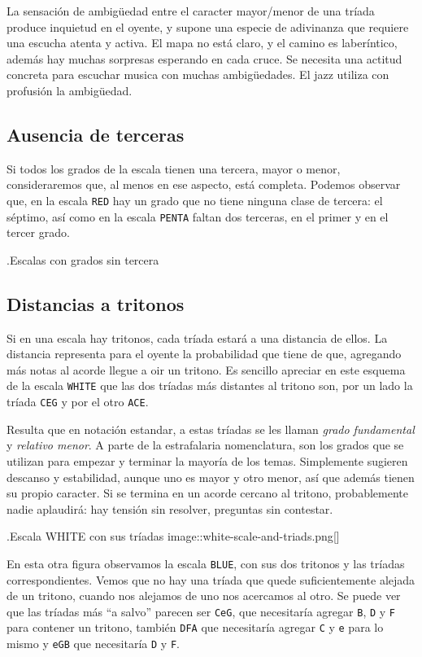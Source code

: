 \documentclass[]{article}
\begin{document}
La sensación de ambigüedad entre el caracter mayor/menor de una tríada produce inquietud en el oyente, y supone una especie de adivinanza que requiere una escucha atenta y activa. El mapa no está claro, y el camino es laberíntico, además hay muchas sorpresas esperando en cada cruce. Se necesita una actitud concreta para escuchar musica con muchas ambigüedades. El jazz utiliza con profusión la ambigüedad.

\subsection{Ausencia de terceras}

Si todos los grados de la escala tienen una tercera, mayor o menor, consideraremos que, al menos en ese aspecto, está completa. Podemos observar que, en la escala \texttt{RED} hay un grado que no tiene ninguna clase de tercera: el séptimo, así como en la escala \texttt{PENTA} faltan dos terceras, en el primer y en el tercer grado.

.Escalas con grados sin tercera

\subsection{Distancias a tritonos}

Si en una escala hay tritonos, cada tríada estará a una distancia de ellos. La distancia representa para el oyente la probabilidad que tiene de que, agregando más notas al acorde llegue a oir un tritono. Es sencillo apreciar en este esquema de la escala \texttt{WHITE} que las dos tríadas más distantes al tritono son, por un lado la tríada \texttt{CEG} y por el otro \texttt{ACE}.

Resulta que en notación estandar, a estas tríadas se les llaman \emph{grado fundamental} y \emph{relativo menor}. A parte de la estrafalaria nomenclatura, son los grados que se utilizan para empezar y terminar la mayoría de los temas. Simplemente sugieren descanso y estabilidad, aunque uno es mayor y otro menor, así que además tienen su propio caracter. Si se termina en un acorde cercano al tritono, probablemente nadie aplaudirá: hay tensión sin resolver, preguntas sin contestar.

.Escala WHITE con sus tríadas image::white-scale-and-triads.png{[}{]}

En esta otra figura observamos la escala \texttt{BLUE}, con sus dos tritonos y las tríadas correspondientes. Vemos que no hay una tríada que quede suficientemente alejada de un tritono, cuando nos alejamos de uno nos acercamos al otro. Se puede ver que las tríadas más ``a salvo'' parecen ser \texttt{CeG}, que necesitaría agregar \texttt{B}, \texttt{D} y \texttt{F} para contener un tritono, también \texttt{DFA} que necesitaría agregar \texttt{C} y \texttt{e} para lo mismo y \texttt{eGB} que necesitaría \texttt{D} y \texttt{F}.
\end{document}
